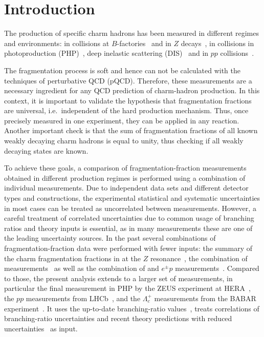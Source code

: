 \newpage
\section{Introduction}
\label{sec:int}
The production of specific charm hadrons has
been measured in different regimes and environments: in 
\epem collisions at $B$-factories~\cite{Bortoletto:1988kw,
Avery:1990bc,Albrecht:1991ss,Albrecht:1991pa,
Albrecht:1988an,Aubert:2002ue,
Seuster:2005tr,Aubert:2006cp}  and in $Z$
decays~\cite{Alexander:1996wy,Ackerstaff:1997ki,Barate:1999bg, 
Abreu:1999vw,Abreu:1999vx}, in \ep collisions in photoproduction 
(PHP)~\cite{Chekanov:2005mm,Abramowicz:2013eja},  deep inelastic 
scattering (DIS)~\cite{Chekanov:2007ch,
Abramowicz:2010aa,Aktas:2004ka} and in
$pp$ collisions~\cite{Aaij:2013mga}.

The fragmentation process is soft and hence can not be calculated with
the techniques of perturbative QCD (pQCD).
%
Therefore, these measurements 
are a necessary ingredient for any QCD prediction of 
charm-hadron production.
%
In this context, it is important to validate the hypothesis 
that fragmentation 
fractions are universal, i.e.\ independent of the hard production 
mechanism. Thus, once precisely measured in one experiment, they can 
be applied in any reaction.
%
Another important check is that the sum of fragmentation fractions of 
all known weakly decaying charm hadrons is equal to unity, thus checking if all 
weakly decaying states are known.

To achieve these goals, a comparison of fragmentation-fraction 
measurements obtained in different production regimes 
is performed using a combination of individual measurements.
%
Due to independent data sets and different detector types and 
constructions, the experimental statistical and systematic uncertainties 
in most cases can be treated as uncorrelated between measurements.
%
However, a careful treatment of correlated uncertainties due to common 
usage of
branching ratios and theory inputs is essential, as in many measurements 
these are one of the leading uncertainty sources.
%
In the past several combinations of fragmentation-fraction data were 
performed with fewer inputs: the summary of the charm fragmentation 
fractions in \epem at the $Z$ resonance~\cite{PDG2014}, the combination 
of \epem measurements~\cite{Gladilin:1999pj,Gladilin:2014tba} as well as 
the combination of \epem and $e^{\pm}p$ 
measurements~\cite{Lohrmann:2011np}.
%
Compared to those, the present analysis extends to a larger set of 
measurements, in particular the final measurement in PHP by the ZEUS 
experiment at HERA~\cite{Abramowicz:2013eja},  the $pp$ measurements 
from LHCb~\cite{Aaij:2013mga}, and the $\Lambda_c^{+}$ measurements from 
the BABAR experiment~\cite{Aubert:2006cp}. It uses the up-to-date 
branching-ratio values~\cite{PDG2014,Zupanc:2013iki,Ablikim:2014mww,
Aubert:2005ik}, treats correlations of 
branching-ratio uncertainties and recent theory predictions with 
reduced uncertainties~\cite{Chetyrkin:2000zk,Freitas:2014hra} as input.

